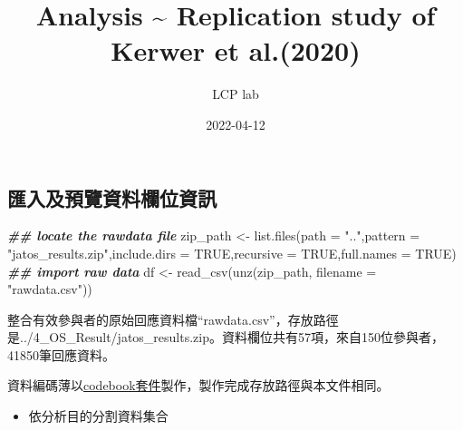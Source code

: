 \documentclass[
]{article}
\title{Analysis \textasciitilde{} Replication study of Kerwer et
al.(2020)}
\author{LCP lab}
\date{2022-04-12}
\newenvironment{Shaded}{\begin{snugshade}}{\end{snugshade}}
\newcommand{\AttributeTok}[1]{\textcolor[rgb]{0.77,0.63,0.00}{#1}}
\newcommand{\ConstantTok}[1]{\textcolor[rgb]{0.00,0.00,0.00}{#1}}
\newcommand{\DocumentationTok}[1]{\textcolor[rgb]{0.56,0.35,0.01}{\textbf{\textit{#1}}}}
\newcommand{\FunctionTok}[1]{\textcolor[rgb]{0.00,0.00,0.00}{#1}}
\newcommand{\NormalTok}[1]{#1}
\newcommand{\OtherTok}[1]{\textcolor[rgb]{0.56,0.35,0.01}{#1}}
\newcommand{\StringTok}[1]{\textcolor[rgb]{0.31,0.60,0.02}{#1}}
\providecommand{\tightlist}{%
  \setlength{\itemsep}{0pt}\setlength{\parskip}{0pt}}
\begin{document}
\maketitle

{
\setcounter{tocdepth}{4}
\tableofcontents
}
\hypertarget{ux532fux5165ux53caux9810ux89bdux8cc7ux6599ux6b04ux4f4dux8cc7ux8a0a}{%
\subsection{匯入及預覽資料欄位資訊}\label{ux532fux5165ux53caux9810ux89bdux8cc7ux6599ux6b04ux4f4dux8cc7ux8a0a}}

\begin{Shaded}
\begin{Highlighting}[]
\DocumentationTok{\#\# locate the rawdata file}
\NormalTok{zip\_path }\OtherTok{\textless{}{-}} \FunctionTok{list.files}\NormalTok{(}\AttributeTok{path =} \StringTok{".."}\NormalTok{,}\AttributeTok{pattern =} \StringTok{"jatos\_results.zip"}\NormalTok{,}\AttributeTok{include.dirs =} \ConstantTok{TRUE}\NormalTok{,}\AttributeTok{recursive =} \ConstantTok{TRUE}\NormalTok{,}\AttributeTok{full.names =} \ConstantTok{TRUE}\NormalTok{)}
\DocumentationTok{\#\# import raw data}
\NormalTok{df }\OtherTok{\textless{}{-}} \FunctionTok{read\_csv}\NormalTok{(}\FunctionTok{unz}\NormalTok{(zip\_path, }\AttributeTok{filename =} \StringTok{"rawdata.csv"}\NormalTok{))}
\end{Highlighting}
\end{Shaded}

整合有效參與者的原始回應資料檔``rawdata.csv''，存放路徑是../4\_OS\_Result/jatos\_results.zip。資料欄位共有57項，來自150位參與者，41850筆回應資料。

資料編碼薄以\href{codebook.Rmd}{codebook套件}製作，製作完成存放路徑與本文件相同。

\begin{itemize}
\tightlist
\item
  依分析目的分割資料集合
\end{itemize}
\end{document}
